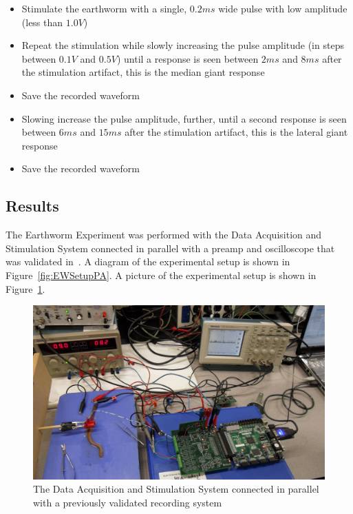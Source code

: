 \begin{itemize}

\item Stimulate the earthworm with a single, $0.2\unit{ms}$ wide pulse with low amplitude (less than $1.0\unit{V}$)

\item Repeat the stimulation while slowly increasing the pulse amplitude (in steps between $0.1\unit{V}$ and $0.5\unit{V}$) until a response is seen between $2\unit{ms}$ and $8\unit{ms}$ after the stimulation artifact, this is the median giant response

\item Save the recorded waveform

\item Slowing increase the pulse amplitude, further, until a second response is seen between $6\unit{ms}$ and $15\unit{ms}$ after the stimulation artifact, this is the lateral giant response

\item Save the recorded waveform

\end{itemize}

\subsection{Results}\label{sec:results}

The Earthworm Experiment was performed with the Data Acquisition and Stimulation System connected in parallel with a preamp and oscilloscope that was validated in~\cite{StahlMSEE}.  A diagram of the experimental setup is shown in Figure~\ref{fig:EWSetupPA}.  A picture of the experimental setup is shown in Figure~\ref{fig:EWSetupPic}.

\begin{figure}[H]
	\begin{singlespace}
	\centering 
		\includegraphics[width=\textwidth-0.75in]{./figures/EWSetupPic} 
	\caption{The Data Acquisition and Stimulation System connected in parallel with a previously validated recording system\label{fig:EWSetupPic}}
	\end{singlespace}
\end{figure}


